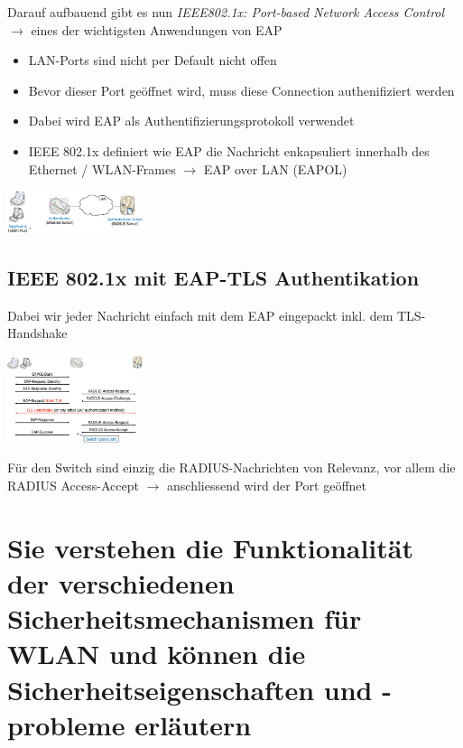 \documentclass{report}
\newenvironment{Figure}
	{\par\medskip\noindent\minipage{\linewidth}}
	{\endminipage\par\medskip}
\theoremstyle{definition}
\theoremstyle{example}
\begin{document}
	Darauf aufbauend gibt es nun \textit{IEEE802.1x: Port-based Network Access Control} $\rightarrow$ eines der wichtigsten Anwendungen von EAP\\
	\begin{itemize}
		\item LAN-Ports sind nicht per Default nicht offen
		\item Bevor dieser Port geöffnet wird, muss diese Connection authenifiziert werden
		\item Dabei wird EAP als Authentifizierungsprotokoll verwendet
		\item IEEE 802.1x definiert wie EAP die Nachricht enkapsuliert innerhalb des Ethernet / WLAN-Frames $\rightarrow$ EAP over LAN (EAPOL)
	\end{itemize}
\begin{Figure}
\centering
\includegraphics[width=150px]{img/EAPSchema.png}
	\label{fig:Schema bei einem IEEE802.1x Aufbau}
\end{Figure}

	\subsection{IEEE 802.1x mit EAP-TLS Authentikation}
Dabei wir jeder Nachricht einfach mit dem EAP eingepackt inkl. dem TLS-Handshake
\begin{Figure}
\centering
\includegraphics[width=150px]{img/EAPTLS.png}
	\label{fig:Nachrichtenverlauf eines IEEE 802.1x mit EAP-TLS Authentikation}
\end{Figure}
Für den Switch sind einzig die RADIUS-Nachrichten von Relevanz, vor allem die RADIUS Access-Accept $\rightarrow$ anschliessend wird der Port geöffnet

\section{Sie verstehen die Funktionalität der verschiedenen Sicherheitsmechanismen für WLAN und können die Sicherheitseigenschaften und -probleme erläutern}
\end{document}
